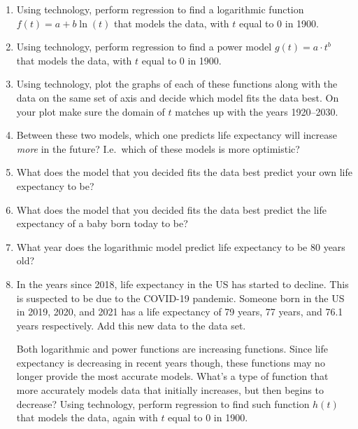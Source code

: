 \begin{minipage}[t]{0.83\textwidth}
    \begin{enumerate}
        \item
    Using technology, perform regression to
            find a logarithmic function \(f(t) = a + b\ln(t)\) 
    that models the data,
    with \(t\) equal to \(0\) in 1900.

        \item
    Using technology, perform regression to
    find a power model \(g(t) = a\cdot t^b\) 
    that models the data,
    with \(t\) equal to \(0\) in 1900.

        \item
            Using technology,
    plot the graphs of each of these functions
    along with the data on the same set of axis
    and decide which model fits the data best. 
    On your plot make sure the domain of \(t\)
    matches up with the years 1920--2030.

\item 
    Between these two models, which one 
            predicts life expectancy will  increase \emph{more} in the future?
            I.e.~which of these models is more optimistic?

\item 
    What does the model that you decided 
            fits the data best predict your own life expectancy to be?

\item 
    What does the model that you decided 
            fits the data best predict 
            the life expectancy of a baby born today to be?

\item 
    What year does the logarithmic model
    predict life expectancy to be 80 years old?

\item 
    In the years since 2018, 
    life expectancy in the US has started to decline\footnotemark.
            This is suspected to be due to the \textsc{COVID}-19 pandemic.
            Someone born in the US in 2019, 2020, and 2021 
            has a life expectancy of 79 years, 77 years, and 76.1 years respectively.
            Add this new data to the data set.

            Both logarithmic and power functions are increasing functions.
            Since life expectancy is decreasing in recent years though,
            these functions may no longer provide the most accurate models.
            What's a type of function that more accurately models
            data that initially increases, but then begins to decrease?
            Using technology, perform regression to
            find such function \(h(t)\) 
            that models the data,
            again with \(t\) equal to \(0\) in 1900.


\end{enumerate}
\end{minipage}
